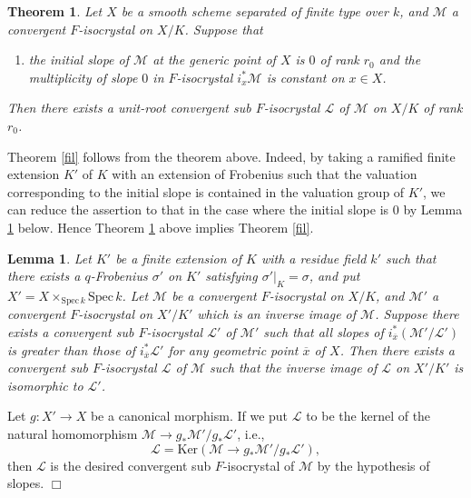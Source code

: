 \documentclass[11pt]{amsart}
\newtheorem{theorem}[Lemma]{Theorem}
\newtheorem{lemma}[Lemma]{Lemma}
\begin{document}
\begin{theorem}\label{fila} 
Let $X$ be a smooth scheme separated of finite type over $k$, and $\mathcal M$ 
a convergent $F$-isocrystal on $X/K$. Suppose that 
\begin{enumerate}
\item[($\ast$)] the initial slope of $\mathcal M$ 
at the generic point of $X$ is $0$ of rank $r_0$ 
and the multiplicity of slope $0$ in $F$-isocrystal $i_x^\ast\mathcal M$ is constant on $x \in X$. 
\end{enumerate}
Then there exists a unit-root convergent sub $F$-isocrystal $\mathcal L$ of $\mathcal M$ on $X/K$ of rank $r_0$. 
\end{theorem}

Theorem \ref{fil} follows from the theorem above. Indeed, 
by taking a ramified finite extension $K'$ of $K$ 
with an extension of Frobenius such that the valuation corresponding 
to the initial slope is contained in the valuation group of $K'$, 
we can reduce the assertion to that in the case where the initial slope is $0$ 
by Lemma \ref{sca} below. 
Hence Theorem \ref{fila} above implies Theorem \ref{fil}. 

\begin{lemma}\label{sca} Let $K'$ be a finite extension of $K$ with a residue field $k'$ such that there 
exists a $q$-Frobenius $\sigma'$ on $K'$ satisfying $\sigma'|_K = \sigma$, 
and put $X' = X \times_{\mathrm{Spec}\, k}\mathrm{Spec}\, k$. 
Let $\mathcal M$ be a convergent $F$-isocrystal on $X/K$, and $\mathcal M'$ a convergent $F$-isocrystal 
on $X'/K'$ which is an inverse image of $\mathcal M$. Suppose there exists a convergent sub $F$-isocrystal $\mathcal L'$ 
of $\mathcal M'$ such that all slopes of $i_{\overline{x}}^\ast(\mathcal M'/\mathcal L')$ 
is greater than those of $i_{\overline{x}}^\ast\mathcal L'$ for any geometric point $\overline{x}$ of $X$. 
Then there exists a convergent sub $F$-isocrystal $\mathcal L$ of $\mathcal M$ 
such that the inverse image of $\mathcal L$ on $X'/K'$ is isomorphic to $\mathcal L'$. 
\end{lemma}

{ {Let $g : X' \rightarrow X$ be a canonical morphism. If we put $\mathcal L$ 
to be the kernel of the natural homomorphism $\mathcal M \rightarrow g_\ast\mathcal M'/g_\ast\mathcal L'$, i.e., 
$$
      \mathcal L = \mathrm{Ker}(\mathcal M \rightarrow g_\ast\mathcal M'/g_\ast\mathcal L'), 
$$
then $\mathcal L$ is the desired convergent sub $F$-isocrystal of $\mathcal M$ by the hypothesis of slopes.} \hspace*{\fill} $\Box$}
\end{document}
